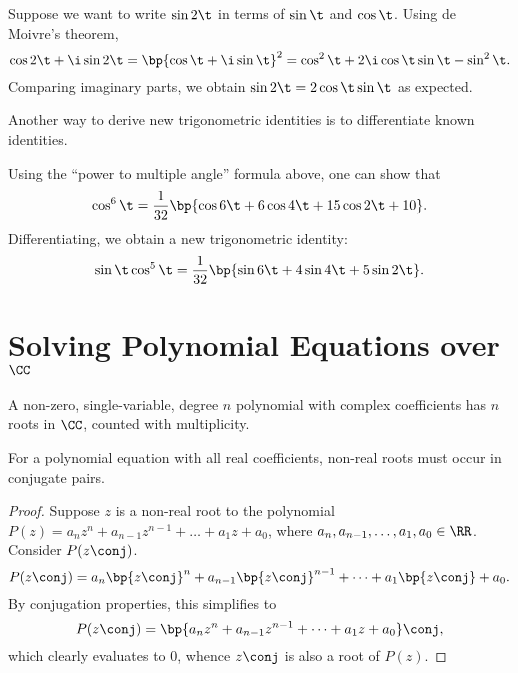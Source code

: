 \begin{example}
    Suppose we want to write $\sin 2\t$ in terms of $\sin \t$ and $\cos \t$. Using de Moivre's theorem, \[\cos 2\t + \i \sin 2\t = \bp{\cos \t + \i \sin \t}^2 = \cos^2 \t + 2\i \cos \t \sin \t - \sin^2 \t.\] Comparing imaginary parts, we obtain $\sin 2\t = 2\cos\t\sin\t$ as expected.
\end{example}

Another way to derive new trigonometric identities is to differentiate known identities.

\begin{example}
    Using the ``power to multiple angle'' formula above, one can show that \[\cos^6 \t = \frac1{32} \bp{\cos 6\t + 6\cos4\t + 15\cos2\t + 10}.\] Differentiating, we obtain a new trigonometric identity: \[\sin \t \cos^5 \t = \frac1{32} \bp{\sin 6\t + 4\sin 4\t + 5\sin 2\t}.\]
\end{example}

\section{Solving Polynomial Equations over \texorpdfstring{$\CC$}{Complex Numbers}}

\begin{theorem}
    A non-zero, single-variable, degree $n$ polynomial with complex coefficients has $n$ roots in $\CC$, counted with multiplicity.
\end{theorem}

\begin{theorem}
    For a polynomial equation with all real coefficients, non-real roots must occur in conjugate pairs.
\end{theorem}
\begin{proof}
    Suppose $z$ is a non-real root to the polynomial $P(z) = a_n z^n + a_{n-1} z^{n-1} + \dots + a_1 z + a_0$, where $a_n, a_{n-1}, \dots, a_1, a_0 \in \RR$. Consider $P(z\conj)$. \[P(z\conj) = a_n \bp{z\conj}^n + a_{n-1} \bp{z\conj}^{n-1} + \dots + a_1 \bp{z\conj} + a_0.\] By conjugation properties, this simplifies to \[P(z\conj) = \bp{a_n z^n + a_{n-1} z^{n-1} + \dots + a_1 z + a_0}\conj,\] which clearly evaluates to 0, whence $z\conj$ is also a root of $P(z)$.
\end{proof}